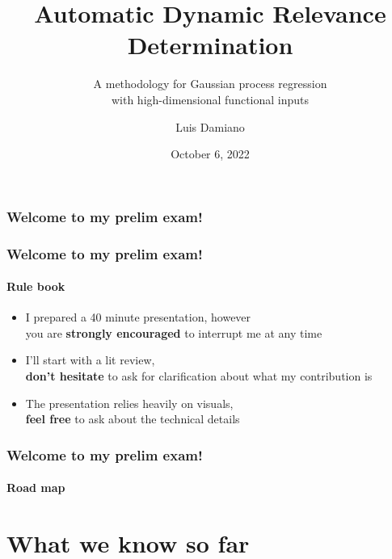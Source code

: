 \documentclass[handout]{snedecorbeamer}
\begin{document}
\title{Automatic Dynamic Relevance Determination}
\subtitle{A methodology for Gaussian process regression\\
  with high-dimensional functional inputs}
\author{Luis Damiano}
\date{October 6, 2022}

\begin{frame}
  \titlepage{}
\end{frame}

\begin{frame}
  \frametitle{Welcome to my prelim exam!}
\end{frame}

\begin{frame}
  \frametitle{Welcome to my prelim exam!}
  \framesubtitle{Rule book}

  \begin{itemize}[<+(1)->]
  \item I prepared a 40 minute presentation, however\\
  you are \textbf{strongly encouraged} to interrupt me at any time
  \item I'll start with a lit review,\\
    \textbf{don't hesitate} to ask for clarification about what my contribution is
  \item The presentation relies heavily on visuals,\\
    \textbf{feel free} to ask about the technical details
  \end{itemize}
\end{frame}

\begin{frame}
  \frametitle{Welcome to my prelim exam!}
  \framesubtitle{Road map}

  \tableofcontents
\end{frame}

\section{What we know so far}
\end{document}
